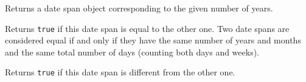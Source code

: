 
Returns a date span object corresponding to the given number of years.



\label{wxdatespanoperatorequal}


Returns {\tt true} if this date span is equal to the other one. Two date spans
are considered equal if and only if they have the same number of years and
months and the same total number of days (counting both days and weeks).

\label{wxdatespanoperatornotequal}


Returns {\tt true} if this date span is different from the other one.


